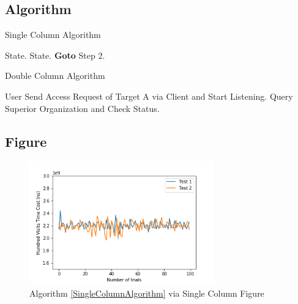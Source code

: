 \documentclass[conference]{IEEEtran}
\begin{document}
\subsection{Algorithm}
\begin{algorithm}[htp]
  \caption{\label{SingleColumnAlgorithm}Single Column Algorithm}
  \begin{algorithmic}[1]
    \STATE State.
    \ENDIF
    \STATE State.
    \STATE \textbf{Goto} Step 2. %
    \ENDIF
    \ENDIF
  \end{algorithmic}
\end{algorithm}

\begin{algorithm*}[htp]
  \caption{\label{DoubleColumnAlgorithm}Double Column Algorithm}
  \begin{algorithmic}[1]
    \REQUIRE User Send Access Request of Target A via Client and Start Listening.
    \STATE Query Superior Organization and Check Status.
    \ENDIF
    \ENDWHILE
  \end{algorithmic}
\end{algorithm*}

\subsection{Figure}
\begin{figure}[htbp]
  \centerline{\includegraphics[width=8cm]{figures/Query_Label.png}}
  \caption{Algorithm \ref{SingleColumnAlgorithm} via Single Column Figure\label{SingleColumnFigure}}
\end{figure}
\end{document}
